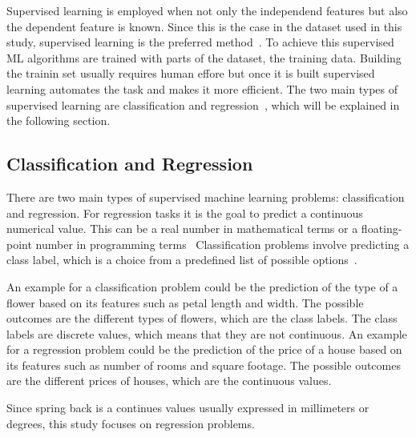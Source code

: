 Supervised learning is employed when not only the independend features but also the dependent feature is known.
Since this is the case in the dataset used in this study, supervised learning is the preferred
method~\cite[p. 25]{muller_introductionmachinelearning_2016}.
To achieve this supervised \ac{ML} algorithms are trained with parts of the dataset, the training data.
Building the trainin set usually requires human effore but once it is built supervised learning automates the task
and makes it more efficient. The two main types of supervised learning are classification and
regression~\cite[p. 25]{muller_introductionmachinelearning_2016}, which will be explained in the following section.

\subsection{Classification and Regression}\label{subsec:regression}
There are two main types of supervised machine learning problems: classification and
regression.
For regression tasks it is the goal to predict a continuous numerical value.
This can be a real number in mathematical terms or a floating-point number in programming
terms~\cite[p. 226]{muller_introductionmachinelearning_2016}
Classification problems involve predicting a class label, which is a choice from a
predefined list of possible options~\cite[p. 25]{muller_introductionmachinelearning_2016}.

An example for a classification problem could be the prediction of the type of a flower based on its features such as
petal length and width. The possible outcomes are the different types of flowers, which are the class labels.
The class labels are discrete values, which means that they are not continuous.
An example for a regression problem could be the prediction of the price of a house based on its features such as
number of rooms and square footage. The possible outcomes are the different prices of houses, which are the
continuous values.

Since spring back is a continues values usually expressed in millimeters or degrees, this study focuses on
regression problems.

